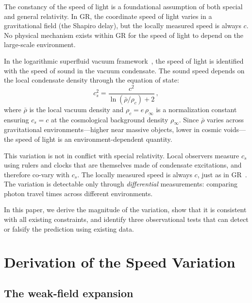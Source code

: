 \documentclass[12pt, a4paper]{article}
\newcommand{\rhob}{\bar{\rho}}
\begin{document}
The constancy of the speed of light is a foundational
assumption of both special and general relativity. In
GR, the coordinate speed of light varies in a
gravitational field (the Shapiro delay), but the
locally measured speed is always $c$. No physical
mechanism exists within GR for the speed of light
to depend on the large-scale environment.

In the logarithmic superfluid vacuum
framework~\cite{kulangiev_2026a,kulangiev_2026b},
the speed of light is identified with the speed of
sound in the vacuum condensate. The sound speed
depends on the local condensate density through the
equation of state:
\begin{equation}
    c_s^2 = \frac{c^2}{\ln(\rhob/\rho_c) + 2}\,,
\label{eq:cs}
\end{equation}
where $\rhob$ is the local vacuum density and
$\rho_c = e\,\rho_\infty$ is a normalization constant
ensuring $c_s = c$ at the cosmological background
density $\rho_\infty$. Since $\rhob$ varies across
gravitational environments---higher near massive
objects, lower in cosmic voids---the speed of light
is an environment-dependent quantity.

This variation is not in conflict with special
relativity. Local observers measure $c_s$ using rulers
and clocks that are themselves made of condensate
excitations, and therefore co-vary with $c_s$. The
locally measured speed is always $c$, just as in
GR~\cite{will_2014}. The variation is detectable only
through \emph{differential} measurements: comparing
photon travel times across different environments.

In this paper, we derive the magnitude of the variation,
show that it is consistent with all existing constraints,
and identify three observational tests that can detect
or falsify the prediction using existing data.


\section{Derivation of the Speed Variation}
\label{sec:derivation}

\subsection{The weak-field expansion}
\end{document}
